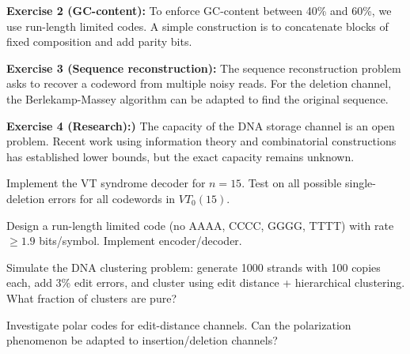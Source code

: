\begin{solution}
\textbf{Exercise 2 (GC-content):} To enforce GC-content between 40\% and 60\%, we use run-length limited codes. A simple construction is to concatenate blocks of fixed composition and add parity bits.
\end{solution}

\begin{solution}
\textbf{Exercise 3 (Sequence reconstruction):} The sequence reconstruction problem asks to recover a codeword from multiple noisy reads. For the deletion channel, the Berlekamp-Massey algorithm can be adapted to find the original sequence.
\end{solution}

\begin{solution}
\textbf{Exercise 4 (Research):)} The capacity of the DNA storage channel is an open problem. Recent work using information theory and combinatorial constructions has established lower bounds, but the exact capacity remains unknown.
\end{solution}

\label{sec:dna:exercises}

\begin{exercise}
Implement the VT syndrome decoder for $n=15$. Test on all possible single-deletion errors for all codewords in $VT_0(15)$.
\end{exercise}

\begin{exercise}
Design a run-length limited code (no AAAA, CCCC, GGGG, TTTT) with rate $\ge 1.9$ bits/symbol. Implement encoder/decoder.
\end{exercise}

\begin{exercise}
Simulate the DNA clustering problem: generate 1000 strands with 100 copies each, add 3\% edit errors, and cluster using edit distance + hierarchical clustering. What fraction of clusters are pure? \cite{barlev2022dna}
\end{exercise}

\begin{exercise}[Research]
Investigate polar codes for edit-distance channels. Can the polarization phenomenon be adapted to insertion/deletion channels?
\end{exercise}